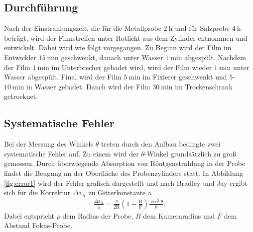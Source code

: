 \subsection{Durchführung}
\label{subsec:durch}
Nach der Einstrahlungszeit, die für die Metallprobe $\SI{2}{\hour}$ und für Salzprobe $\SI{4}{\hour}$ beträgt, wird der Filmstreifen unter Rotlicht
aus dem Zylinder entnommen und entwickelt.
Dabei wird wie folgt vorgegangen.
Zu Beginn wird der Film im Entwickler $\SI{15}{\minute}$ geschwenkt,
danach unter Wasser $\SI{1}{\minute}$ abgespült.
Nachdem der Film $\SI{1}{\minute}$ im Unterbrecher gebadet wird, wird
der Film wieder $\SI{1}{\minute}$ unter Wasser abgespült.
Final wird der Film $\SI{5}{\minute}$ im Fixierer geschwenkt und
$5$-$\SI{10}{\minute}$ in Wasser gebadet.
Danch wird der Film $\SI{30}{\minute}$ im Trockenschrank getrocknet.


\subsection{Systematische Fehler}
\label{subsec:systerr}
Bei der Messung des Winkels $\theta$
treten durch den Aufbau bedingte zwei systematische Fehler auf.
Zu einem wird der $\theta$-Winkel grundsätzlich zu groß gemessen.
Durch überwiegende Absorption von Röntgenstrahlung in der Probe
findet die Beugung an der Oberfläche des
Probenzylinders statt. In Abbildung \ref{fig:error1} wird
der Fehler grafisch dargestellt und nach Bradley und Jay
ergibt sich für die Korrektur
$\Delta \mathrm{a}_{\mathrm{A}}$
zu Gitterkonstante $\mathrm{a}$
\begin{align}
  \frac{\Delta \mathrm{a}_{\mathrm{A}}}{\mathrm{a}}=\frac{\rho}{2\mathrm{R}}\left(1-\frac{\mathrm{R}}{\mathrm{F}}\right)\frac{\cos^2\theta}{\theta}. \label{eqn:sys1}
\end{align}
Dabei entspricht $\rho$ dem Radius der Probe, $R$ dem Kameraradius
und $F$ dem Abstand Fokus-Probe.

